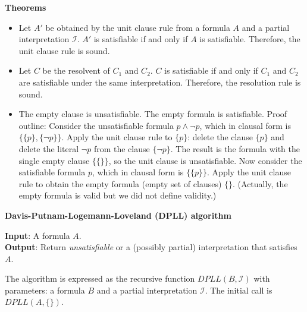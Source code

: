 \documentclass[11pt]{report}
\begin{document}
\bigskip

\begin{center}
\textbf{Theorems}
\end{center}

\begin{itemize}
\item Let $A'$ be obtained by the unit clause rule from a formula $A$
and a partial interpretation $\mathcal{I}$. $A'$ is satisfiable if and
only if $A$ is satisfiable. Therefore, the unit clause rule is sound.

\item Let $C$ be the resolvent of $C_1$ and $C_2$. $C$ is satisfiable if
and only if $C_1$ and $C_2$ are satisfiable under the same
interpretation. Therefore, the resolution rule is sound.

\item The empty clause is unsatisfiable. The empty formula is
satisfiable. Proof outline: Consider the unsatisfiable formula $p \wedge
\neg p$, which in clausal form is $\{\{p\}, \{\neg p\}\}$. Apply the
unit clause rule to $\{p\}$: delete the clause $\{p\}$ and delete the
literal $\neg p$ from the clause $\{\neg p\}$. The result is the formula
with the single empty clause $\{\{\}\}$, so the unit clause is
unsatisfiable. Now consider the satisfiable formula $p$, which in
clausal form is $\{\{p\}\}$. Apply the unit clause rule to obtain the
empty formula (empty set of clauses) $\{\}$. (Actually, the empty
formula is valid but we did not define validity.)

\end{itemize}

\newpage

\begin{center}
\textbf{Davis-Putnam-Logemann-Loveland (DPLL) algorithm}
\end{center}

\textbf{Input}: A formula $A$.\\
\textbf{Output}: Return \emph{unsatisfiable} or a (possibly partial)
interpretation that satisfies $A$.

The algorithm is expressed as the recursive function
$\textit{DPLL}(B,\mathcal{I})$ with parameters: a formula $B$ and a
partial interpretation $\mathcal{I}$. The initial call is
$\textit{DPLL}(A,\{\})$. 

\medskip
\end{document}
